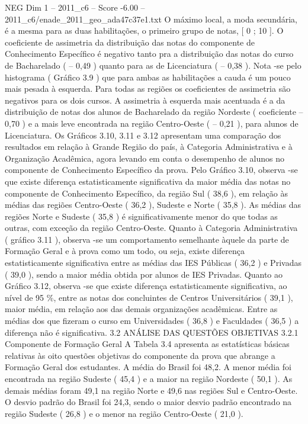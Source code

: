 \begin{textsample}{NEG Dim 1 – 2011\_c6 – Score -6.00 – 2011\_c6/enade\_2011\_geo\_ada47c37e1.txt}
O máximo local, a moda secundária, é a mesma para as duas habilitações, o primeiro grupo de notas, [ 0 ; 10 ].
O coeficiente de assimetria da distribuição das notas do componente de Conhecimento Específico é negativo tanto pra a distribuição das notas do curso de Bacharelado ( – 0,49 ) quanto para as de Licenciatura ( – 0,38 ).
Nota -se pelo histograma ( Gráfico 3.9 ) que para ambas as habilitações a cauda é um pouco mais pesada à esquerda.
Para todas as regiões os coeficientes de assimetria são negativos para os dois cursos.
A assimetria à esquerda mais acentuada é a da distribuição de notas dos alunos de Bacharelado da região Nordeste ( coeficiente – 0,70 ) e a mais leve encontrada na região Centro-Oeste ( – 0,21 ), para alunos de Licenciatura.
Os Gráficos 3.10, 3.11 e 3.12 apresentam uma comparação dos resultados em relação à Grande Região do país, à Categoria Administrativa e à Organização Acadêmica, agora levando em conta o desempenho de alunos no componente de Conhecimento Específico da prova.
Pelo Gráfico 3.10, observa -se que existe diferença estatisticamente significativa da maior média das notas no componente de Conhecimento Específico, da região Sul ( 38,6 ), em relação às médias das regiões Centro-Oeste ( 36,2 ), Sudeste e Norte ( 35,8 ).
As médias das regiões Norte e Sudeste ( 35,8 ) é significativamente menor do que todas as outras, com exceção da região Centro-Oeste.
Quanto à Categoria Administrativa ( gráfico 3.11 ), observa -se um comportamento semelhante àquele da parte de Formação Geral e à prova como um todo, ou seja, existe diferença estatisticamente significativa entre as médias das IES Públicas ( 36,2 ) e Privadas ( 39,0 ), sendo a maior média obtida por alunos de IES Privadas.
Quanto ao Gráfico 3.12, observa -se que existe diferença estatisticamente significativa, ao nível de 95 \%, entre as notas dos concluintes de Centros Universitários ( 39,1 ), maior média, em relação aos das demais organizações acadêmicas.
Entre as médias dos que fizeram o curso em Universidades ( 36,8 ) e Faculdades ( 36,5 ) a diferença não é significativa. 3.2 ANÁLISE DAS QUESTÕES OBJETIVAS 3.2.1 Componente de Formação Geral A Tabela 3.4 apresenta as estatísticas básicas relativas às oito questões objetivas do componente da prova que abrange a Formação Geral dos estudantes.
A média do Brasil foi 48,2.
A menor média foi encontrada na região Sudeste ( 45,4 ) e a maior na região Nordeste ( 50,1 ).
As demais médias foram 49,1 na região Norte e 49,6 nas regiões Sul e Centro-Oeste.
O desvio padrão do Brasil foi 24,3, sendo o maior desvio padrão encontrado na região Sudeste ( 26,8 ) e o menor na região Centro-Oeste ( 21,0 ).

\end{textsample}
